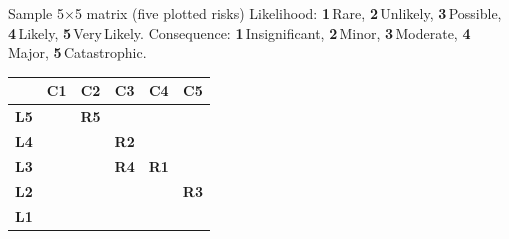 \documentclass[11pt,a4paper]{article}
\begin{document}
\begin{solutionbox}{Sample 5$\times$5 matrix (five plotted risks)}
Likelihood: \textbf{1}\,Rare, \textbf{2}\,Unlikely, \textbf{3}\,Possible, \textbf{4}\,Likely, \textbf{5}\,Very\,Likely.\quad
Consequence: \textbf{1}\,Insignificant, \textbf{2}\,Minor, \textbf{3}\,Moderate, \textbf{4}\,Major, \textbf{5}\,Catastrophic.


\begin{center}\footnotesize
\setlength{\tabcolsep}{4pt}\renewcommand{\arraystretch}{1.15}
\begin{tabular}{@{}c|ccccc@{}}
 & \textbf{C1} & \textbf{C2} & \textbf{C3} & \textbf{C4} & \textbf{C5} \\ \hline
\textbf{L5} & \cellcolor{rmyellow} & \cellcolor{rmyellow}\textbf{R5} & \cellcolor{rmorange} & \cellcolor{rmred} & \cellcolor{rmred} \\
\textbf{L4} & \cellcolor{rmgreen} & \cellcolor{rmyellow} & \cellcolor{rmorange}\textbf{R2} & \cellcolor{rmred} & \cellcolor{rmred} \\
\textbf{L3} & \cellcolor{rmgreen} & \cellcolor{rmyellow} & \cellcolor{rmyellow}\textbf{R4} & \cellcolor{rmred}\textbf{R1} & \cellcolor{rmred} \\
\textbf{L2} & \cellcolor{rmgreen} & \cellcolor{rmgreen} & \cellcolor{rmyellow} & \cellcolor{rmorange} & \cellcolor{rmred}\textbf{R3} \\
\textbf{L1} & \cellcolor{rmgreen} & \cellcolor{rmgreen} & \cellcolor{rmgreen} & \cellcolor{rmyellow} & \cellcolor{rmorange} \\
\end{tabular}
\end{center}


\end{solutionbox}
\end{document}
